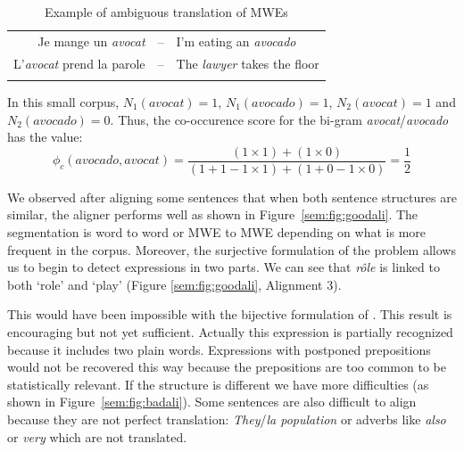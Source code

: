 \documentclass[output=paper,modfonts,nonflat]{langsci/langscibook}
\begin{document}
\begin{table}[h!]
\begin{tabular}{rcl}
  \lsptoprule
Je mange un \emph{avocat} & -- & I'm eating an \emph{avocado} \\
L'\emph{avocat} prend la parole & -- & The \emph{lawyer} takes the floor \\
  \lspbottomrule
\end{tabular}
\caption{\label{sem:tab:probtrans} Example of ambiguous translation of MWEs}
\end{table}

In this small corpus, $N_1(\mathit{avocat}) = 1$, $N_1(\mathit{avocado}) = 1$, $N_2(\mathit{avocat}) = 1$ and $N_2(\mathit{avocado}) = 0$. Thus, the co-occurence score for the bi-gram \textit{avocat}\slash \textit{avocado} has the value:
\begin{equation}
\phi_{c}(\mathit{avocado},\mathit{avocat}) = \frac{(1 \times 1) + (1 \times 0)}{(1 + 1 -1 \times 1) + (1 + 0 - 1 \times 0)} = \frac{1}{2}
\end{equation}

We observed after aligning some sentences that when both sentence structures are similar, the aligner performs well as shown in Figure~\ref{sem:fig:goodali}. The segmentation is word to word or MWE to MWE depending on what is more frequent in the corpus. Moreover, the surjective formulation of the problem allows us to begin to detect expressions in two parts. 
We can see that \textit{rôle} is linked to both `role' and `play' (Figure \ref{sem:fig:goodali}, Alignment 3).

This would have been impossible with the bijective formulation of \citet{denero2008complexity}. This result is encouraging but not yet sufficient. 
Actually this expression is partially recognized because it includes two plain words. 
Expressions with postponed prepositions would not be recovered this way because the prepositions are too common to be statistically relevant.
If the structure is different we have more difficulties (as shown in Figure~\ref{sem:fig:badali}). 
Some sentences are also difficult to align because they are not perfect translation: 
\textit{They}\slash\textit{la population} or adverbs like \textit{also} or \textit{very} which are not translated.
\end{document}

